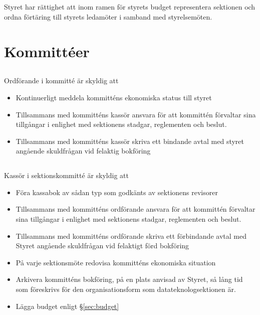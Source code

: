 \documentclass[a4paper, 10pt]{article}
\begin{document}
\subsection{}
Styret har rättighet att inom ramen för styrets budget representera sektionen och ordna förtäring till styrets ledamöter i samband med styrelsemöten.

\section{Kommittéer}
\label{sec:kommitteer}
\subsection{}
Ordförande i kommitté är skyldig att
\begin{itemize}
\item Kontinuerligt meddela kommitténs ekonomiska status till styret
\item Tillsammans med kommitténs kassör ansvara för att kommittén förvaltar sina tillgångar i enlighet med sektionens stadgar, reglementen och beslut.
\item Tillsammans med kommitténs kassör skriva ett bindande avtal med styret angående skuldfrågan vid felaktig bokföring
\end{itemize}
\subsection{}
\label{sec:kommittee_kassor}
Kassör i sektionskommitté är skyldig att
\begin{itemize}
\item Föra kassabok av sådan typ som godkänts av sektionens revisorer
\item Tillsammans med kommitténs ordförande ansvara för att kommittén förvaltar sina tillgångar i enlighet med sektionens stadgar, reglementen och beslut.
\item Tillsammans med kommitténs ordförande skriva ett förbindande avtal med Styret angående skuldfrågan vid felaktigt förd bokföring
\item På varje sektionsmöte redovisa kommitténs ekonomiska situation
\item Arkivera kommitténs bokföring, på en plats anvisad av Styret, så lång tid som föreskrivs för den organisationsform som datateknologsektionen är.
\item Lägga budget enligt \S\ref{sec:budget}
\end{itemize}
\end{document}
